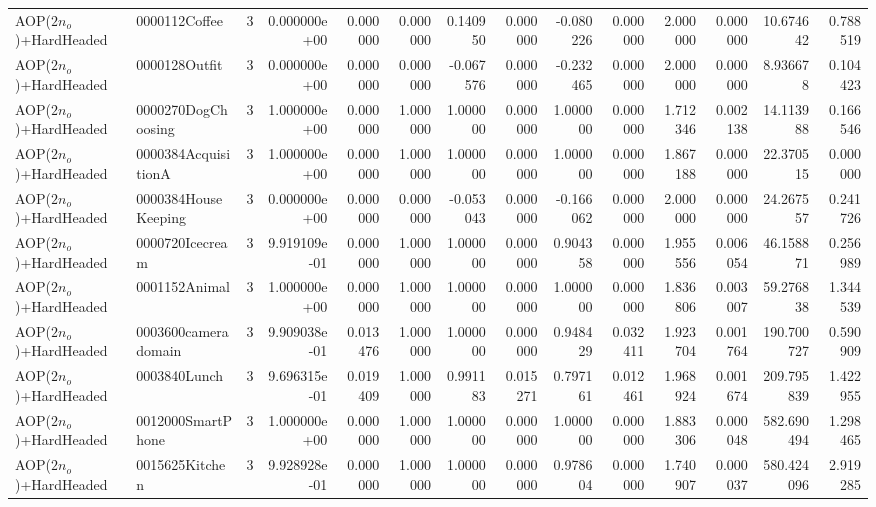 \begin{tabular}{llrr|r|rr|rr|rr|rrr}
  AOP($2 n_o$)+HardHeaded &          0000112Coffee &       3 & 0.000000e+00 & 0.000000 & 0.000000 &      0.140950 & 0.000000 &     -0.080226 & 0.000000 &      2.000000 &    0.000000 &    10.674642 &    0.788519 \\
  AOP($2 n_o$)+HardHeaded &          0000128Outfit &       3 & 0.000000e+00 & 0.000000 & 0.000000 &     -0.067576 & 0.000000 &     -0.232465 & 0.000000 &      2.000000 &    0.000000 &     8.936678 &    0.104423 \\
  AOP($2 n_o$)+HardHeaded &     0000270DogChoosing &       3 & 1.000000e+00 & 0.000000 & 1.000000 &      1.000000 & 0.000000 &      1.000000 & 0.000000 &      1.712346 &    0.002138 &    14.113988 &    0.166546 \\
  AOP($2 n_o$)+HardHeaded &    0000384AcquisitionA &       3 & 1.000000e+00 & 0.000000 & 1.000000 &      1.000000 & 0.000000 &      1.000000 & 0.000000 &      1.867188 &    0.000000 &    22.370515 &    0.000000 \\
  AOP($2 n_o$)+HardHeaded &    0000384HouseKeeping &       3 & 0.000000e+00 & 0.000000 & 0.000000 &     -0.053043 & 0.000000 &     -0.166062 & 0.000000 &      2.000000 &    0.000000 &    24.267557 &    0.241726 \\
  AOP($2 n_o$)+HardHeaded &        0000720Icecream &       3 & 9.919109e-01 & 0.000000 & 1.000000 &      1.000000 & 0.000000 &      0.904358 & 0.000000 &      1.955556 &    0.006054 &    46.158871 &    0.256989 \\
  AOP($2 n_o$)+HardHeaded &          0001152Animal &       3 & 1.000000e+00 & 0.000000 & 1.000000 &      1.000000 & 0.000000 &      1.000000 & 0.000000 &      1.836806 &    0.003007 &    59.276838 &    1.344539 \\
  AOP($2 n_o$)+HardHeaded &    0003600cameradomain &       3 & 9.909038e-01 & 0.013476 & 1.000000 &      1.000000 & 0.000000 &      0.948429 & 0.032411 &      1.923704 &    0.001764 &   190.700727 &    0.590909 \\
  AOP($2 n_o$)+HardHeaded &           0003840Lunch &       3 & 9.696315e-01 & 0.019409 & 1.000000 &      0.991183 & 0.015271 &      0.797161 & 0.012461 &      1.968924 &    0.001674 &   209.795839 &    1.422955 \\
  AOP($2 n_o$)+HardHeaded &      0012000SmartPhone &       3 & 1.000000e+00 & 0.000000 & 1.000000 &      1.000000 & 0.000000 &      1.000000 & 0.000000 &      1.883306 &    0.000048 &   582.690494 &    1.298465 \\
  AOP($2 n_o$)+HardHeaded &         0015625Kitchen &       3 & 9.928928e-01 & 0.000000 & 1.000000 &      1.000000 & 0.000000 &      0.978604 & 0.000000 &      1.740907 &    0.000037 &   580.424096 &    2.919285 \\

\end{tabular}

